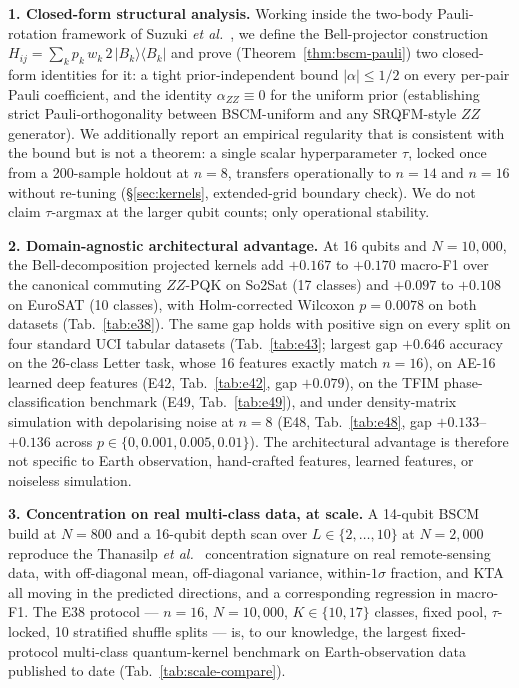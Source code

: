 \documentclass[pdflatex,sn-mathphys]{sn-jnl}
\theoremstyle{plain}
\theoremstyle{remark}
\theoremstyle{definition}
\begin{document}
\medskip
\noindent\textbf{1. Closed-form structural analysis.} Working inside the two-body Pauli-rotation framework of Suzuki \emph{et al.}\ \cite{suzuki2020}, we define the Bell-projector construction $H_{ij}=\sum_k p_k\,w_k\,2\,|B_k\rangle\!\langle B_k|$ and prove (Theorem~\ref{thm:bscm-pauli}) two closed-form identities for it: a tight prior-independent bound $|\alpha|\le 1/2$ on every per-pair Pauli coefficient, and the identity $\alpha_{ZZ}\equiv 0$ for the uniform prior (establishing strict Pauli-orthogonality between BSCM-uniform and any SRQFM-style $ZZ$ generator).  We additionally report an empirical regularity that is consistent with the bound but is not a theorem: a single scalar hyperparameter $\tau$, locked once from a 200-sample holdout at $n=8$, transfers operationally to $n=14$ and $n=16$ without re-tuning (\S\ref{sec:kernels}, extended-grid boundary check).  We do not claim $\tau$-argmax at the larger qubit counts; only operational stability.

\medskip
\noindent\textbf{2. Domain-agnostic architectural advantage.} At 16 qubits and $N=10{,}000$, the Bell-decomposition projected kernels add $+0.167$ to $+0.170$ macro-F1 over the canonical commuting $ZZ$-PQK on So2Sat (17 classes) and $+0.097$ to $+0.108$ on EuroSAT (10 classes), with Holm-corrected Wilcoxon $p=0.0078$ on both datasets (Tab.~\ref{tab:e38}).  The same gap holds with positive sign on every split on four standard UCI tabular datasets (Tab.~\ref{tab:e43}; largest gap $+0.646$ accuracy on the 26-class Letter task, whose 16 features exactly match $n=16$), on AE-16 learned deep features (E42, Tab.~\ref{tab:e42}, gap $+0.079$), on the TFIM phase-classification benchmark (E49, Tab.~\ref{tab:e49}), and under density-matrix simulation with depolarising noise at $n=8$ (E48, Tab.~\ref{tab:e48}, gap $+0.133$--$+0.136$ across $p\in\{0, 0.001, 0.005, 0.01\}$).  The architectural advantage is therefore not specific to Earth observation, hand-crafted features, learned features, or noiseless simulation.

\medskip
\noindent\textbf{3. Concentration on real multi-class data, at scale.} A 14-qubit BSCM build at $N=800$ and a 16-qubit depth scan over $L\in\{2,\dots,10\}$ at $N=2{,}000$ reproduce the Thanasilp \emph{et al.}\ \cite{thanasilp2024} concentration signature on real remote-sensing data, with off-diagonal mean, off-diagonal variance, within-$1\sigma$ fraction, and KTA all moving in the predicted directions, and a corresponding regression in macro-F1. The E38 protocol --- $n=16$, $N=10{,}000$, $K\in\{10,17\}$ classes, fixed pool, $\tau$-locked, 10 stratified shuffle splits --- is, to our knowledge, the largest fixed-protocol multi-class quantum-kernel benchmark on Earth-observation data published to date (Tab.~\ref{tab:scale-compare}).
\end{document}
